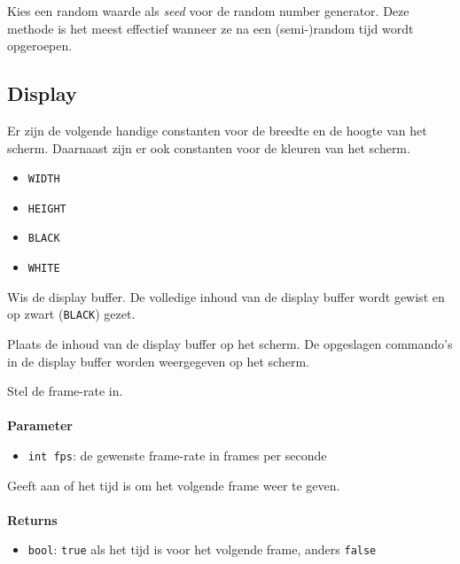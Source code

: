 \documentclass[11pt,fleqn]{book} %
\begin{document}
\begin{libf}[initRandomSeed()]
	Kies een random waarde als \emph{seed} voor de random number generator. Deze methode is het meest effectief wanneer ze na een (semi-)random tijd wordt opgeroepen.
\end{libf}

\subsection{Display}

\begin{libf}[Display]
	Er zijn de volgende handige constanten voor de breedte en de hoogte van het scherm. Daarnaast zijn er ook constanten voor de kleuren van het scherm.
	\begin{multicols}{2}
		\begin{itemize}
			\item \texttt{WIDTH}
			\item \texttt{HEIGHT}
			\item \texttt{BLACK}
			\item \texttt{WHITE}
		\end{itemize}
	\end{multicols}
\end{libf}

\begin{libf}[clear()]
	Wis de display buffer. De volledige inhoud van de display buffer wordt gewist en op zwart (\texttt{BLACK}) gezet.
\end{libf}

\begin{libf}[display()]
	Plaats de inhoud van de display buffer op het scherm. De opgeslagen commando's in de display buffer worden weergegeven op het scherm.
\end{libf}

\begin{libf}
	Stel de frame-rate in.\\ \\
	\textbf{Parameter}
	\begin{itemize}
		\item \texttt{int fps}: de gewenste frame-rate in frames per seconde
	\end{itemize}
\end{libf}

\begin{libf}[nextFrame()]
	Geeft aan of het tijd is om het volgende frame weer te geven.\\ \\
	\textbf{Returns}
	\begin{itemize}
		\item \texttt{bool}: \texttt{true} als het tijd is voor het volgende frame, anders \texttt{false}
	\end{itemize}
\end{libf}
\end{document}
